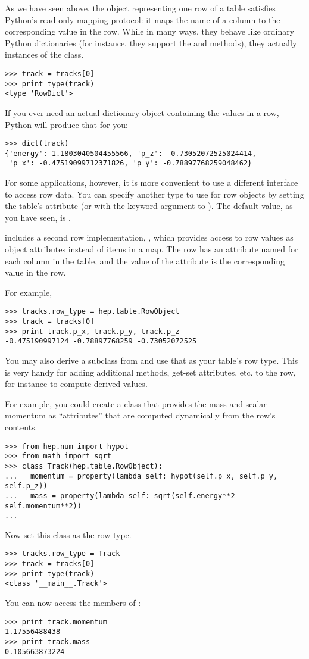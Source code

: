 As we have seen above, the object representing one row of a table
satisfies Python's read-only mapping protocol: it maps the name of a
column to the corresponding value in the row.  While in many ways, they
behave like ordinary Python dictionaries (for instance, they support the
 and  methods), they actually instances of
the  class.
\begin{verbatim}
>>> track = tracks[0]
>>> print type(track)
<type 'RowDict'>
\end{verbatim}
If you ever need an actual dictionary object containing the values in a
row, Python will produce that for you:
\begin{verbatim}
>>> dict(track)
{'energy': 1.1803040504455566, 'p_z': -0.73052072525024414, 
 'p_x': -0.47519099712371826, 'p_y': -0.78897768259048462}
\end{verbatim}

For some applications, however, it is more convenient to use a different
interface to access row data.  You can specify another type to use for
row objects by setting the table's  attribute (or with
the  keyword argument to ).  The
default value, as you have seen, is .

\pyhep includes a second row implementation,
, which provides access to row values as
object attributes instead of items in a map.  The row has an attribute
named for each column in the table, and the value of the attribute is
the corresponding value in the row.

For example,
\begin{verbatim}
>>> tracks.row_type = hep.table.RowObject
>>> track = tracks[0]
>>> print track.p_x, track.p_y, track.p_z
-0.475190997124 -0.78897768259 -0.73052072525
\end{verbatim}

You may also derive a subclass from  and use that as
your table's row type.  This is very handy for adding additional
methods, get-set attributes, etc. to the row, for instance to compute
derived values.

For example, you could create a  class that provides the
mass and scalar momentum as ``attributes'' that are computed dynamically
from the row's contents.
\begin{verbatim}
>>> from hep.num import hypot
>>> from math import sqrt
>>> class Track(hep.table.RowObject):
...   momentum = property(lambda self: hypot(self.p_x, self.p_y, self.p_z))
...   mass = property(lambda self: sqrt(self.energy**2 - self.momentum**2))
...
\end{verbatim}
Now set this class as the row type.
\begin{verbatim}
>>> tracks.row_type = Track
>>> track = tracks[0]
>>> print type(track)
<class '__main__.Track'>
\end{verbatim}
You can now access the members of :
\begin{verbatim}
>>> print track.momentum
1.17556488438
>>> print track.mass
0.105663873224
\end{verbatim}

